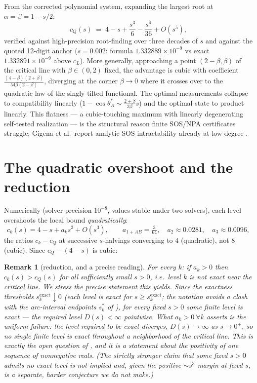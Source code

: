 \documentclass[11pt]{article}
\newtheorem{remark}[theorem]{Remark}
\begin{document}
From the corrected polynomial system, expanding the largest root at
$\alpha=\beta=1-s/2$:
\[
c_Q(s)\;=\;4-s+\frac{s^3}{6}-\frac{s^4}{36}+O(s^5),
\]
verified against high-precision root-finding over three decades of $s$ and
against the quoted 12-digit anchor ($s=0.002$: formula $1.332889\times10^{-9}$
vs exact $1.332891\times10^{-9}$ above $c_L$). More generally, approaching a
point $(2-\beta,\beta)$ of the critical line with $\beta\in(0,2)$ fixed, the
advantage is cubic with coefficient
$\tfrac{(4-\beta)(2+\beta)}{54\beta(2-\beta)}$, diverging at the corner
$\beta\to0$ where it crosses over to the quadratic law of the singly-tilted
functional. The optimal measurements collapse to compatibility linearly
($1-\cos\theta_{A}^{*}\sim\tfrac{2+\beta}{3\beta}s$) and the optimal state to
product linearly. This flatness --- a cubic-touching maximum with linearly
degenerating self-tested realization --- is the structural reason finite
SOS/NPA certificates struggle; Gigena et al.\ report analytic SOS
intractability already at low degree \cite{Gigena}.

\section{The quadratic overshoot and the reduction}

Numerically (solver precision $10^{-8}$, values stable under two solvers),
each level overshoots the local bound \emph{quadratically}:
\[
c_k(s)=4-s+a_k s^2+O(s^3),\qquad
a_{1+AB}=\tfrac{3}{64},\quad a_2\approx0.0281,\quad a_3\approx 0.0096,
\]
the ratios $c_k-c_Q$ at successive $s$-halvings converging to $4$ (quadratic),
not $8$ (cubic). Since $c_Q-(4-s)$ is cubic:

\begin{remark}[reduction, and a precise reading]
For every $k$: if $a_k>0$ then $c_k(s)>c_Q(s)$ for all sufficiently small
$s>0$, i.e.\ level $k$ is not exact \emph{near the critical line}. We stress the
precise statement this yields. Since the exactness thresholds
$s^{\mathrm{exact}}_k\downarrow0$
(each level \emph{is} exact for $s\ge s^{\mathrm{exact}}_k$; the notation
avoids a clash with the arc-interval endpoints $s^\ast_k$ of
\cite{proof}), for every \emph{fixed} $s>0$ some
finite level is exact --- the required level $D(s)<\infty$ pointwise. What
$a_k>0\ \forall k$ asserts is the \emph{uniform} failure: the level required to be
exact \emph{diverges}, $D(s)\to\infty$ as $s\to0^+$, so no single finite level is
exact throughout a neighborhood of the critical line. This is exactly the open
question of \cite{Gigena}, and it is a statement about the positivity of one
sequence of nonnegative reals. (The strictly stronger claim that some fixed $s>0$
admits \emph{no} exact level is not implied and, given the positive $\sim s^3$
margin at fixed $s$, is a separate, harder conjecture we do not make.)
\end{remark}
\end{document}
